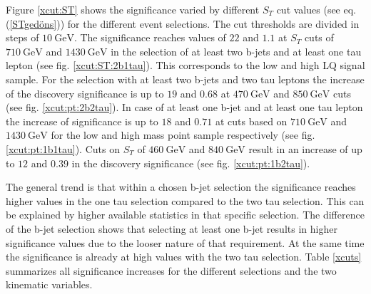 %
Figure \ref{xcut:ST} shows the significance varied by different $S_T$ cut values (see eq. (\ref{STgedöns})) for the different event selections. The cut thresholds are divided in steps of $\SI{10}{\giga\electronvolt}$. The significance reaches values of $22$ and $1.1$ at $S_T$ cuts of $\SI{710}{\giga\electronvolt}$ and $\SI{1430}{\giga\electronvolt}$ in the selection of at least two b-jets and at least one tau lepton (see fig. \ref{xcut:ST:2b1tau}). This corresponds to the low and high LQ signal sample. For the selection with at least two b-jets and two tau leptons the increase of the discovery significance is up to $19$ and $0.68$ at $\SI{470}{\giga\electronvolt}$ and $\SI{850}{\giga\electronvolt}$ cuts (see fig. \ref{xcut:pt:2b2tau}). In case of at least one b-jet and at least one tau lepton the increase of significance is up to $18$ and $0.71$ at cuts based on $\SI{710}{\giga\electronvolt}$ and $\SI{1430}{\giga\electronvolt}$ for the low and high mass point sample respectively (see fig. \ref{xcut:pt:1b1tau}). Cuts on $S_T$ of $\SI{460}{\giga\electronvolt}$ and $\SI{840}{\giga\electronvolt}$ result in an increase of up to $12$ and $0.39$ in the discovery significance (see fig. \ref{xcut:pt:1b2tau}).\par
The general trend is that within a chosen b-jet selection the significance reaches higher values in the one tau selection compared to the two tau selection. This can be explained by higher available statistics in that specific selection. The difference of the b-jet selection shows that selecting at least one b-jet results in higher significance values due to the looser nature of that requirement. At the same time the significance is already at high values with the two tau selection. Table \ref{xcuts} summarizes all significance increases for the different selections and the two kinematic variables.
%	
